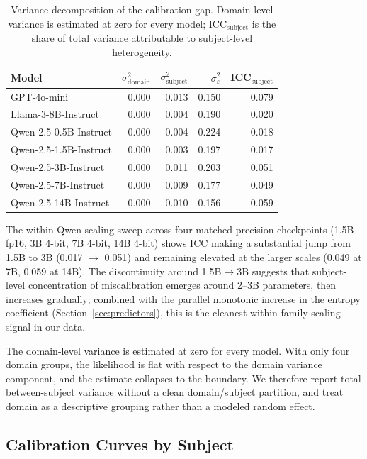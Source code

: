 \documentclass[11pt]{article}
\begin{document}
\begin{table}[h]
\centering
\caption{Variance decomposition of the calibration gap. Domain-level variance
is estimated at zero for every model; ICC$_\text{subject}$ is the share of
total variance attributable to subject-level heterogeneity.}
\label{tab:icc}
\begin{tabular}{lrrrr}
\toprule
Model & $\sigma^2_{\text{domain}}$ & $\sigma^2_{\text{subject}}$ & $\sigma^2_\varepsilon$ & ICC$_{\text{subject}}$ \\
\midrule
GPT-4o-mini             & 0.000 & 0.013 & 0.150 & 0.079 \\
Llama-3-8B-Instruct     & 0.000 & 0.004 & 0.190 & 0.020 \\
Qwen-2.5-0.5B-Instruct  & 0.000 & 0.004 & 0.224 & 0.018 \\
Qwen-2.5-1.5B-Instruct  & 0.000 & 0.003 & 0.197 & 0.017 \\
Qwen-2.5-3B-Instruct    & 0.000 & 0.011 & 0.203 & 0.051 \\
Qwen-2.5-7B-Instruct    & 0.000 & 0.009 & 0.177 & 0.049 \\
Qwen-2.5-14B-Instruct   & 0.000 & 0.010 & 0.156 & 0.059 \\
\bottomrule
\end{tabular}
\end{table}

The within-Qwen scaling sweep across four matched-precision checkpoints
(1.5B fp16, 3B 4-bit, 7B 4-bit, 14B 4-bit) shows ICC making a substantial
jump from 1.5B to 3B (0.017 $\to$ 0.051) and remaining elevated at the larger
scales (0.049 at 7B, 0.059 at 14B). The discontinuity around 1.5B$\to$3B
suggests that subject-level concentration of miscalibration emerges around
2--3B parameters, then increases gradually; combined with the parallel
monotonic increase in the entropy coefficient (Section~\ref{sec:predictors}),
this is the cleanest within-family scaling signal in our data.

The domain-level variance is estimated at zero for every model. With only four
domain groups, the likelihood is flat with respect to the domain variance
component, and the estimate collapses to the boundary. We therefore report total
between-subject variance without a clean domain/subject partition, and treat
domain as a descriptive grouping rather than a modeled random effect.

\subsection{Calibration Curves by Subject}
\label{sec:curves}
\end{document}

